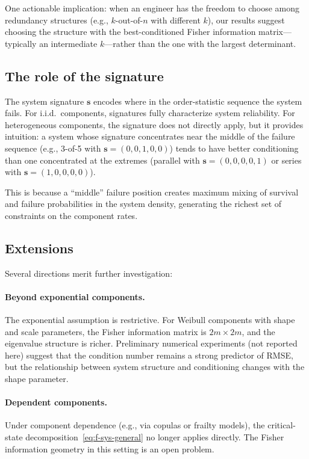 \documentclass[12pt]{article}
\theoremstyle{definition}
\theoremstyle{remark}
\begin{document}
One actionable implication: when an engineer has the freedom to choose
among redundancy structures (e.g., $k$-out-of-$n$ with different $k$),
our results suggest choosing the structure with the best-conditioned
Fisher information matrix---typically an intermediate $k$---rather
than the one with the largest determinant.

\subsection{The role of the signature}
\label{sec:role-of-signature}

The system signature $\mathbf{s}$ \citep{Samaniego1985} encodes where
in the order-statistic sequence the system fails.  For i.i.d.\
components, signatures fully characterize system reliability.  For
heterogeneous components, the signature does not directly apply, but
it provides intuition: a system whose signature concentrates near the
middle of the failure sequence (e.g., 3-of-5 with
$\mathbf{s} = (0, 0, 1, 0, 0)$) tends to have better conditioning
than one concentrated at the extremes (parallel with
$\mathbf{s} = (0, 0, 0, 0, 1)$ or series with
$\mathbf{s} = (1, 0, 0, 0, 0)$).

This is because a ``middle'' failure position creates maximum
mixing of survival and failure probabilities in the system density,
generating the richest set of constraints on the component rates.

\subsection{Extensions}
\label{sec:extensions}

Several directions merit further investigation:

\paragraph{Beyond exponential components.}
The exponential assumption is restrictive.  For Weibull components
with shape and scale parameters, the Fisher information matrix is
$2m \times 2m$, and the eigenvalue structure is richer.  Preliminary
numerical experiments (not reported here) suggest that the condition
number remains a strong predictor of RMSE, but the relationship
between system structure and conditioning changes with the shape
parameter.

\paragraph{Dependent components.}
Under component dependence (e.g., via copulas or frailty models),
the critical-state decomposition~\eqref{eq:f-sys-general} no longer
applies directly.  The Fisher information geometry in this setting is
an open problem.
\end{document}
